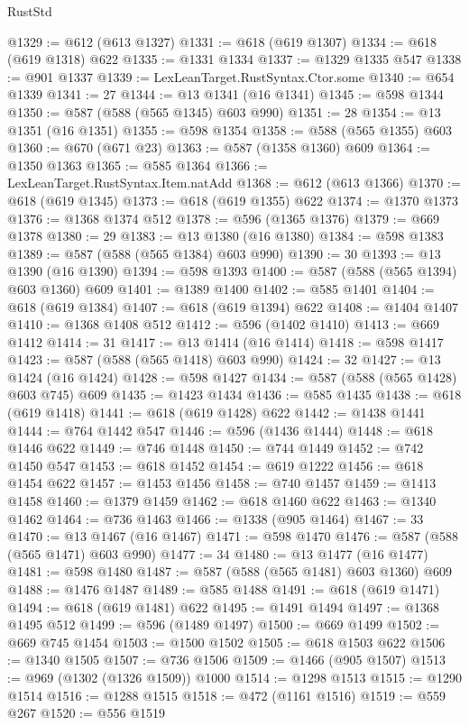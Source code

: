 \begin{lexlean}{RustStd}
\begin{coremodule}
@1329 := @612 (@613 @1327)
@1331 := @618 (@619 @1307)
@1334 := @618 (@619 @1318) @622
@1335 := @1331 @1334
@1337 := @1329 @1335 @547
@1338 := @901 @1337
@1339 := LexLeanTarget.RustSyntax.Ctor.some
@1340 := @654 @1339
@1341 := 27
@1344 := @13 @1341 (@16 @1341)
@1345 := @598 @1344
@1350 := @587 (@588 (@565 @1345) @603 @990)
@1351 := 28
@1354 := @13 @1351 (@16 @1351)
@1355 := @598 @1354
@1358 := @588 (@565 @1355) @603
@1360 := @670 (@671 @23)
@1363 := @587 (@1358 @1360) @609
@1364 := @1350 @1363
@1365 := @585 @1364
@1366 := LexLeanTarget.RustSyntax.Item.natAdd
@1368 := @612 (@613 @1366)
@1370 := @618 (@619 @1345)
@1373 := @618 (@619 @1355) @622
@1374 := @1370 @1373
@1376 := @1368 @1374 @512
@1378 := @596 (@1365 @1376)
@1379 := @669 @1378
@1380 := 29
@1383 := @13 @1380 (@16 @1380)
@1384 := @598 @1383
@1389 := @587 (@588 (@565 @1384) @603 @990)
@1390 := 30
@1393 := @13 @1390 (@16 @1390)
@1394 := @598 @1393
@1400 := @587 (@588 (@565 @1394) @603 @1360) @609
@1401 := @1389 @1400
@1402 := @585 @1401
@1404 := @618 (@619 @1384)
@1407 := @618 (@619 @1394) @622
@1408 := @1404 @1407
@1410 := @1368 @1408 @512
@1412 := @596 (@1402 @1410)
@1413 := @669 @1412
@1414 := 31
@1417 := @13 @1414 (@16 @1414)
@1418 := @598 @1417
@1423 := @587 (@588 (@565 @1418) @603 @990)
@1424 := 32
@1427 := @13 @1424 (@16 @1424)
@1428 := @598 @1427
@1434 := @587 (@588 (@565 @1428) @603 @745) @609
@1435 := @1423 @1434
@1436 := @585 @1435
@1438 := @618 (@619 @1418)
@1441 := @618 (@619 @1428) @622
@1442 := @1438 @1441
@1444 := @764 @1442 @547
@1446 := @596 (@1436 @1444)
@1448 := @618 @1446 @622
@1449 := @746 @1448
@1450 := @744 @1449
@1452 := @742 @1450 @547
@1453 := @618 @1452
@1454 := @619 @1222
@1456 := @618 @1454 @622
@1457 := @1453 @1456
@1458 := @740 @1457
@1459 := @1413 @1458
@1460 := @1379 @1459
@1462 := @618 @1460 @622
@1463 := @1340 @1462
@1464 := @736 @1463
@1466 := @1338 (@905 @1464)
@1467 := 33
@1470 := @13 @1467 (@16 @1467)
@1471 := @598 @1470
@1476 := @587 (@588 (@565 @1471) @603 @990)
@1477 := 34
@1480 := @13 @1477 (@16 @1477)
@1481 := @598 @1480
@1487 := @587 (@588 (@565 @1481) @603 @1360) @609
@1488 := @1476 @1487
@1489 := @585 @1488
@1491 := @618 (@619 @1471)
@1494 := @618 (@619 @1481) @622
@1495 := @1491 @1494
@1497 := @1368 @1495 @512
@1499 := @596 (@1489 @1497)
@1500 := @669 @1499
@1502 := @669 @745 @1454
@1503 := @1500 @1502
@1505 := @618 @1503 @622
@1506 := @1340 @1505
@1507 := @736 @1506
@1509 := @1466 (@905 @1507)
@1513 := @969 (@1302 (@1326 @1509)) @1000
@1514 := @1298 @1513
@1515 := @1290 @1514
@1516 := @1288 @1515
@1518 := @472 (@1161 @1516)
@1519 := @559 @267
@1520 := @556 @1519

\end{coremodule}
\end{lexlean}
